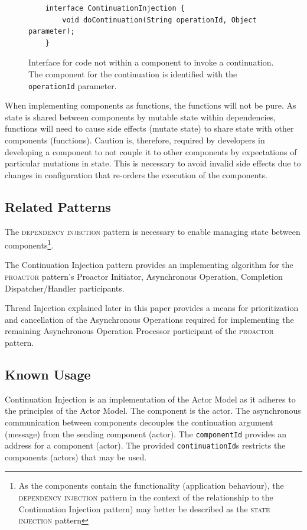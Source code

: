 \documentclass[prodmode]{style/acmlarge}
\begin{document}
\begin{figure}[tp]
\begin{verbatim}
    interface ContinuationInjection {
        void doContinuation(String operationId, Object parameter);
    }
\end{verbatim}
\caption{Interface for code not within a component to invoke a continuation.  The component for the continuation is identified with the \texttt{operationId} parameter.}
\label{fig:ContinuationInjectionInterface}
\end{figure}

When implementing components as functions, the functions will not be pure.  As
state is shared between components by mutable state within dependencies,
functions will need to cause side effects (mutate state) to share state with
other components (functions).  Caution is, therefore, required by developers in
developing a component to not couple it to other components by expectations of
particular mutations in state.  This is necessary to avoid invalid side effects
due to changes in configuration that re-orders the execution of the components.


\subsection{Related Patterns}

The \textsc{dependency injection} pattern \cite{ioc} is necessary to enable
managing state between components\footnote{As the components contain the
functionality (application behaviour), the \textsc{dependency injection} pattern
in the context of the relationship to the Continuation Injection pattern) may
better be described as the \textsc{state injection} pattern}.

The Continuation Injection pattern provides an implementing algorithm for the
\textsc{proactor} pattern's Proactor Initiator, Asynchronous Operation, Completion
Dispatcher/Handler participants.

Thread Injection explained later in this paper provides a means for
prioritization and cancellation of the Asynchronous Operations required for
implementing the remaining Asynchronous Operation Processor participant of the
\textsc{proactor} pattern.


\subsection{Known Usage}

Continuation Injection is an implementation of the Actor Model \cite{actors} as
it adheres to the principles of the Actor Model.  The component is the actor.
The asynchronous communication between components decouples the continuation
argument (message) from the sending component (actor).  The \texttt{componentId}
provides an address for a component (actor).  The provided
\texttt{continuationId}s restricts the components (actors) that may be used.
\end{document}
